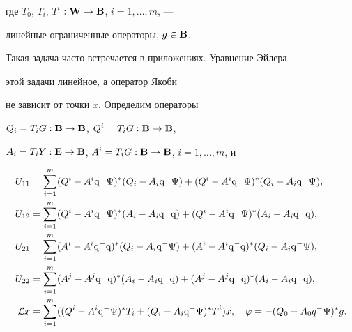 где $T_0$, $T_i$, $T^i$ $:\bold W{}\to\bold B{}$, $i=1,\dotsc,m$, ---


линейные ограниченные операторы, $g\in\bold B{}$.


Такая задача часто встречается в приложениях. Уравнение Эйлера


этой задачи линейное, а оператор Якоби


не зависит от точки $x$. Определим операторы


$Q_i=T_iG:\bold B{}\to\bold B{}$, $Q^i=T_iG:\bold B{}\to\bold B{}$,


$A_i=T_iY:\bold E{}\to\bold B{}$, $A^i=T_iG:\bold B{}\to\bold B{}$, $i=1,\dotsc,m$, и


\begin{align*}


U_{11}&=\sum_{i=1}^m


(Q^i-A^i\q^{-}\Psi)^*(Q_i-A_i\q^{-}\Psi)+


(Q^i-A^i\q^{-}\Psi)^*(Q_i-A_i\q^{-}\Psi), \\


%


U_{12}&=\sum_{i=1}^m


(Q^i-A^i\q^{-}\Psi)^*(A_i-A_i\q^{-}\q)+


(Q^i-A^i\q^{-}\Psi)^*(A_i-A_i\q^{-}\q), \\


%


U_{21}&=\sum_{i=1}^m


(A^i-A^i\q^{-}\q)^*(Q_i-A_i\q^{-}\Psi)+


(A^i-A^i\q^{-}\q)^*(Q_i-A_i\q^{-}\Psi),\\


%


U_{22}&=\sum_{i=1}^m


(A^j-A^j\q^{-}\q)^*(A_i-A_i\q^{-}\q)+


(A^j-A^j\q^{-}\q)^*(A_i-A_i\q^{-}\q), \\


%


{\cal L}x&=\sum_{i=1}^m((Q^i-A^i\q^{-}\Psi)^*T_i+(Q_i-A_i\q^{-}\Psi)^*T^i)x,


\quad \varphi=-(Q_0-A_0q^-\Psi)^*g.


\end{align*}





